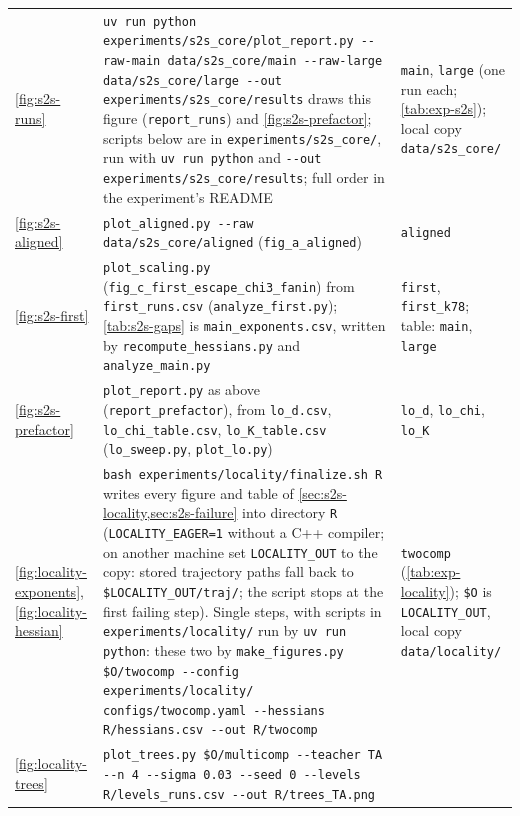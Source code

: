 \begin{xltabular}{\textwidth}{@{}l>{\raggedright\arraybackslash}p{6.4cm}>{\raggedright\arraybackslash}X@{}}
    \ref{fig:s2s-runs} & \texttt{uv run python experiments/s2s\_core/\allowbreak plot\_report.py -{}-raw-main
      data/s2s\_core/main -{}-raw-large data/s2s\_core/large -{}-out experiments/s2s\_core/results} draws this
      figure (\texttt{report\_runs}) and \cref{fig:s2s-prefactor}; scripts below are in
      \texttt{experiments/s2s\_core/}, run with \texttt{uv run python} and \texttt{-{}-out
      experiments/s2s\_core/results}; full order in the experiment's README
      & \texttt{main}, \texttt{large} (one run each; \cref{tab:exp-s2s}); local copy \texttt{data/s2s\_core/} \\
    \ref{fig:s2s-aligned} & \texttt{plot\_aligned.py -{}-raw data/s2s\_core/aligned} (\texttt{fig\_a\_aligned})
      & \texttt{aligned} \\
    \ref{fig:s2s-first} & \texttt{plot\_scaling.py} (\texttt{fig\_c\_first\_escape\_chi3\_fanin}) from
      \texttt{first\_runs.csv} (\texttt{analyze\_first.py}); \cref{tab:s2s-gaps} is
      \texttt{main\_exponents.csv}, written by \texttt{recompute\_hessians.py} and \texttt{analyze\_main.py}
      & \texttt{first}, \texttt{first\_k78}; table: \texttt{main}, \texttt{large} \\
    \ref{fig:s2s-prefactor} & \texttt{plot\_report.py} as above (\texttt{report\_prefactor}), from \texttt{lo\_d.csv},
      \texttt{lo\_chi\_table.csv}, \texttt{lo\_K\_table.csv} (\texttt{lo\_sweep.py}, \texttt{plot\_lo.py})
      & \texttt{lo\_d}, \texttt{lo\_chi}, \texttt{lo\_K} \\
    \ref{fig:locality-exponents}, \ref{fig:locality-hessian} & \texttt{bash
      experiments/locality/finalize.sh R} writes every figure and table of
      \cref{sec:s2s-locality,sec:s2s-failure} into directory \texttt{R} (\texttt{LOCALITY\_EAGER=1}
      without a C++ compiler; on another machine set \texttt{LOCALITY\_OUT} to the copy: stored
      trajectory paths fall back to \texttt{\$LOCALITY\_OUT/traj/}; the script stops at the first failing step).
      Single steps, with scripts in \texttt{experiments/locality/} run by \texttt{uv run python}: these
      two by \texttt{make\_figures.py \$O/twocomp -{}-config experiments/locality/\allowbreak
      configs/twocomp.yaml -{}-hessians R/hessians.csv -{}-out R/twocomp}
      & \texttt{twocomp} (\cref{tab:exp-locality}); \texttt{\$O} is \texttt{LOCALITY\_OUT}, local copy
      \texttt{data/locality/} \\
    \ref{fig:locality-trees} & \texttt{plot\_trees.py \$O/multicomp -{}-teacher TA -{}-n 4 -{}-sigma 0.03
      -{}-seed 0 -{}-levels R/levels\_runs.csv -{}-out R/trees\_TA.png}

\end{xltabular}
